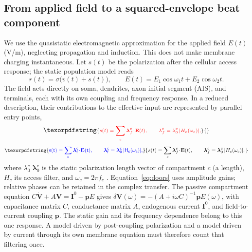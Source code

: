 \documentclass[11pt,a4paper]{article}
\newcommand{\Sig}{\sigma}
\providecommand{\DIFaddtex}[1]{{\protect\color{blue} \sf #1}} %
\providecommand{\DIFdeltex}[1]{{\protect\color{red} \scriptsize #1}} %
\providecommand{\DIFaddbegin}{} %
\providecommand{\DIFaddend}{} %
\providecommand{\DIFdelbegin}{} %
\providecommand{\DIFdelend}{} %
\providecommand{\DIFadd}[1]{\texorpdfstring{\DIFaddtex{#1}}{#1}} %
\providecommand{\DIFdel}[1]{\texorpdfstring{\DIFdeltex{#1}}{}} %
\begin{document}
\subsection{From applied field to a squared-envelope beat component}\label{sec:coupling}
We use the quasistatic electromagnetic approximation for the applied field $E(t)$
(V/m), neglecting propagation and induction. This does not make membrane charging
instantaneous. Let $s(t)$ be the polarization after the cellular access response;
the static population model reads
\begin{equation}
r(t)=\Sig\!\big(v(t)+s(t)\big),\qquad
E(t)=E_1\cos\omega_1 t+E_2\cos\omega_2 t .
\label{eq:coupling}
\end{equation}
The field acts directly on soma, dendrites, axon initial segment (AIS), and terminals,
each with its own coupling and frequency response. In a reduced description, their
contributions to the effective input are represented by parallel entry points,
\DIFdelbegin \begin{displaymath}
\DIFdel{s(t)=\sum_c \boldsymbol\lambda^c_f\!\cdot\!\mathbf E(t),\qquad
\lambda^c_f=\lambda^c_0\,\lvert H_c(\omega_c)\rvert,
}\end{displaymath}%
\DIFdelend \DIFaddbegin \begin{equation}
\DIFadd{s(t)=\sum_c \boldsymbol\lambda^c_f\!\cdot\!\mathbf E(t),\qquad
\boldsymbol\lambda^c_f=\boldsymbol\lambda^c_0\,\lvert H_c(\omega_c)\rvert,
\label{eq:doors}
}\end{equation}\DIFaddend 
where \DIFdelbegin \DIFdel{$\lambda^c_0$ }\DIFdelend \DIFaddbegin \DIFadd{$\boldsymbol\lambda^c_0$ }\DIFaddend is the static polarization \DIFdelbegin \DIFdel{length }\DIFdelend \DIFaddbegin \DIFadd{vector }\DIFaddend of compartment $c$ \DIFaddbegin \DIFadd{(a length)}\DIFaddend ,
$H_c$ its access filter, and $\omega_c=2\pi f_c$
\cite{ruffini2025rosetta,galangadea2023}. Equation~\eqref{eq:doors} uses amplitude
gains; relative phases can be retained in the complex transfer. The passive
compartment equation $C\dot{\mathbf V}+A\mathbf V=\mathbf I^0-\mathbf pE$
\cite{ruffini2021nmm2} gives
$\delta\mathbf V(\omega)=-(A+i\omega C)^{-1}\mathbf pE(\omega)$, with capacitance
matrix $C$, conductance matrix $A$, endogenous current $\mathbf I^0$, and field-to-current
coupling $\mathbf p$. The static gain and its frequency dependence belong to this
one response. A model driven by post-coupling polarization and a model driven by
current through its own membrane equation must therefore count that filtering once.
\end{document}
